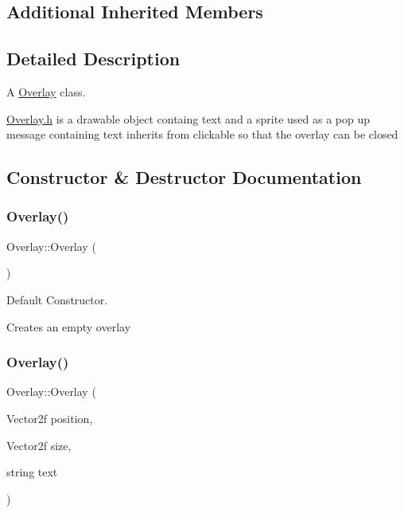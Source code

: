 \subsection*{Additional Inherited Members}


\subsection{Detailed Description}
A \hyperlink{class_overlay}{Overlay} class.

\hyperlink{_overlay_8h_source}{Overlay.\+h} is a drawable object containg text and a sprite used as a pop up message containing text inherits from clickable so that the overlay can be closed 

\subsection{Constructor \& Destructor Documentation}
\hypertarget{class_overlay_ab4f509d502931bcaad03418470993d70}{}\label{class_overlay_ab4f509d502931bcaad03418470993d70} 
\subsubsection{\texorpdfstring{Overlay()}{Overlay()}\hspace{0.1cm}{\footnotesize\ttfamily [1/2]}}
{\footnotesize\ttfamily Overlay\+::\+Overlay (\begin{DoxyParamCaption}{ }\end{DoxyParamCaption})}



Default Constructor. 

Creates an empty overlay \hypertarget{class_overlay_a6cd84b6dc4fdcb2a6fbfafaf5e63e170}{}\label{class_overlay_a6cd84b6dc4fdcb2a6fbfafaf5e63e170} 
\subsubsection{\texorpdfstring{Overlay()}{Overlay()}\hspace{0.1cm}{\footnotesize\ttfamily [2/2]}}
{\footnotesize\ttfamily Overlay\+::\+Overlay (\begin{DoxyParamCaption}\item[{Vector2f}]{position,  }\item[{Vector2f}]{size,  }\item[{string}]{text }\end{DoxyParamCaption})}



